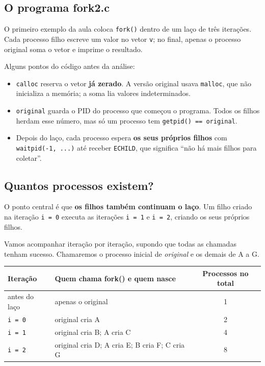 \documentclass[11pt,a4paper]{article}
\newcommand{\raiz}{../../../..}
\newcommand{\cmd}[1]{\texttt{#1}}
\begin{document}
\subsection{O programa fork2.c}

O primeiro exemplo da aula coloca \cmd{fork()} dentro de um laço de três iterações. Cada processo filho escreve um valor no vetor \cmd{v}; no final, apenas o processo original soma o vetor e imprime o resultado.



Alguns pontos do código antes da análise:

\begin{itemize}
    \item \cmd{calloc} reserva o vetor \textbf{já zerado}. A versão original usava \cmd{malloc}, que não inicializa a memória; a soma lia valores indeterminados.
    \item \cmd{original} guarda o PID do processo que começou o programa. Todos os filhos herdam esse número, mas só um processo tem \cmd{getpid() == original}.
    \item Depois do laço, cada processo espera \textbf{os seus próprios filhos} com \cmd{waitpid(-1, ...)} até receber \cmd{ECHILD}, que significa ``não há mais filhos para coletar''.
\end{itemize}

\subsection{Quantos processos existem?}

O ponto central é que \textbf{os filhos também continuam o laço}. Um filho criado na iteração \cmd{i = 0} executa as iterações \cmd{i = 1} e \cmd{i = 2}, criando os seus próprios filhos.

Vamos acompanhar iteração por iteração, supondo que todas as chamadas tenham sucesso. Chamaremos o processo inicial de \emph{original} e os demais de A a G.

\begin{center}
\begin{tabular}{@{}llc@{}}
\toprule
\textbf{Iteração} & \textbf{Quem chama fork() e quem nasce} & \textbf{Processos no total} \\
\midrule
antes do laço & apenas o original & 1 \\
\cmd{i = 0} & original cria A & 2 \\
\cmd{i = 1} & original cria B; A cria C & 4 \\
\cmd{i = 2} & original cria D; A cria E; B cria F; C cria G & 8 \\
\bottomrule
\end{tabular}
\end{center}
\end{document}
